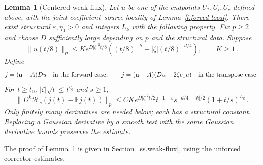 \documentclass[11pt]{amsart}
\newtheorem{lemma}[proposition]{Lemma}
\theoremstyle{definition}
\theoremstyle{remark}
\numberwithin{equation}{section}
\newcommand{\E}{\mathbb E}
\renewcommand{\a}{\mathbf a}
\begin{document}
\begin{lemma}[Centered weak flux]\label{l:forced-flux}
Let $u$ be one of the endpoints $U_*,U_i,U_c$ defined above, with the joint coefficient--source locality of Lemma~\ref{l:forced-local}. There exist structural $\varepsilon,\eta_0>0$ and integers $L_k$ with the following property. Fix $p\geq2$ and choose $D$ sufficiently large depending on $p$ and the structural data. Suppose
\begin{equation*}
 \|u(t/8)\|_p\leq K e^{D|\zeta|^2t/8}
       ((t/8)^{-h}+|\zeta|(t/8)^{-d/4}),\qquad K\geq1\, .
\end{equation*}
Define
\begin{equation*}
 j=(\a-A)Du\quad\hbox{in the forward case},\qquad
 j=(\a-A)(Du-2\zeta e_1u)\quad\hbox{in the transpose case}\, .
\end{equation*}
For $t\geq t_0$, $|\zeta|\sqrt t\leq t^{\eta_0}$ and $s\geq1$,
\begin{equation}\label{e:weak-flux}
 \|D^k\mathcal H_s(j(t)-\E j(t))\|_p
 \leq CK e^{D|\zeta|^2t/2}t^{-1-\varepsilon}
       s^{-d/4-|k|/2}(1+t/s)^{L_k}\, .
\end{equation}
Only finitely many derivatives are needed below; each has a structural constant. Replacing a Gaussian derivative by a smooth test with the same Gaussian derivative bounds preserves the estimate.
\end{lemma}

The proof of Lemma~\ref{l:forced-flux} is given in Section~\ref{ss.weak-flux}, using the unforced corrector estimates.
\end{document}
